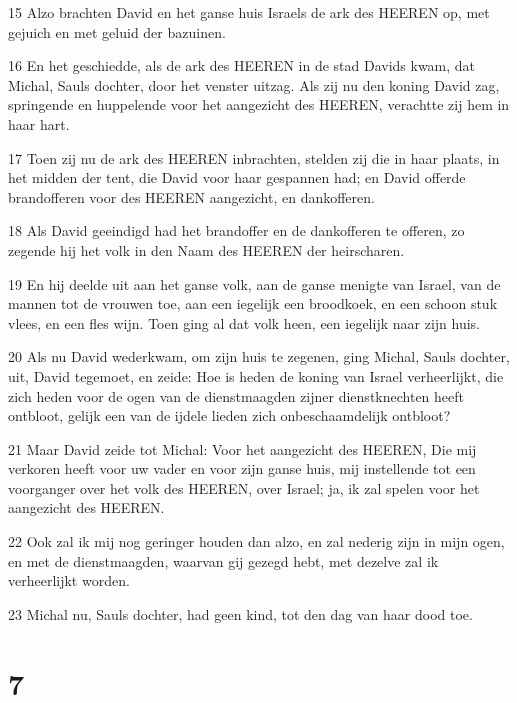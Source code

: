 \par 15 Alzo brachten David en het ganse huis Israels de ark des HEEREN op, met gejuich en met geluid der bazuinen.
\par 16 En het geschiedde, als de ark des HEEREN in de stad Davids kwam, dat Michal, Sauls dochter, door het venster uitzag. Als zij nu den koning David zag, springende en huppelende voor het aangezicht des HEEREN, verachtte zij hem in haar hart.
\par 17 Toen zij nu de ark des HEEREN inbrachten, stelden zij die in haar plaats, in het midden der tent, die David voor haar gespannen had; en David offerde brandofferen voor des HEEREN aangezicht, en dankofferen.
\par 18 Als David geeindigd had het brandoffer en de dankofferen te offeren, zo zegende hij het volk in den Naam des HEEREN der heirscharen.
\par 19 En hij deelde uit aan het ganse volk, aan de ganse menigte van Israel, van de mannen tot de vrouwen toe, aan een iegelijk een broodkoek, en een schoon stuk vlees, en een fles wijn. Toen ging al dat volk heen, een iegelijk naar zijn huis.
\par 20 Als nu David wederkwam, om zijn huis te zegenen, ging Michal, Sauls dochter, uit, David tegemoet, en zeide: Hoe is heden de koning van Israel verheerlijkt, die zich heden voor de ogen van de dienstmaagden zijner dienstknechten heeft ontbloot, gelijk een van de ijdele lieden zich onbeschaamdelijk ontbloot?
\par 21 Maar David zeide tot Michal: Voor het aangezicht des HEEREN, Die mij verkoren heeft voor uw vader en voor zijn ganse huis, mij instellende tot een voorganger over het volk des HEEREN, over Israel; ja, ik zal spelen voor het aangezicht des HEEREN.
\par 22 Ook zal ik mij nog geringer houden dan alzo, en zal nederig zijn in mijn ogen, en met de dienstmaagden, waarvan gij gezegd hebt, met dezelve zal ik verheerlijkt worden.
\par 23 Michal nu, Sauls dochter, had geen kind, tot den dag van haar dood toe.

\chapter{7}

